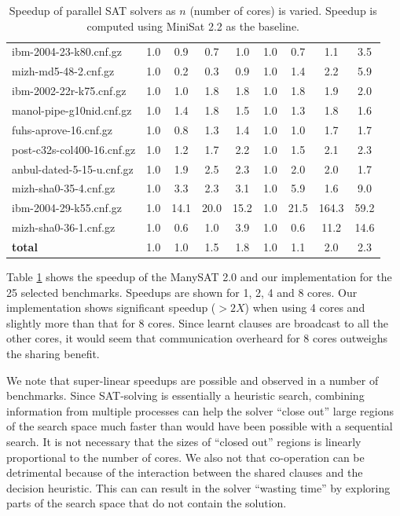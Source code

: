 \documentclass[letterpaper, compsoc, conference]{IEEEtran}
\begin{document}
\begin{table}[htbp]
\begin{center}
\begin{tabular}{|l|c|c|c|c|c|c|c|c|}
        ibm-2004-23-k80.cnf.gz             &       1.0 &  0.9 &  0.7 &  1.0 &  1.0 &  0.7 &  1.1 &  3.5 \\
        mizh-md5-48-2.cnf.gz               &       1.0 &  0.2 &  0.3 &  0.9 &  1.0 &  1.4 &  2.2 &  5.9 \\
        ibm-2002-22r-k75.cnf.gz            &       1.0 &  1.0 &  1.8 &  1.8 &  1.0 &  1.8 &  1.9 &  2.0 \\
        manol-pipe-g10nid.cnf.gz           &       1.0 &  1.4 &  1.8 &  1.5 &  1.0 &  1.3 &  1.8 &  1.6 \\
        fuhs-aprove-16.cnf.gz              &       1.0 &  0.8 &  1.3 &  1.4 &  1.0 &  1.0 &  1.7 &  1.7 \\
        post-c32s-col400-16.cnf.gz         &       1.0 &  1.2 &  1.7 &  2.2 &  1.0 &  1.5 &  2.1 &  2.3 \\
        anbul-dated-5-15-u.cnf.gz          &       1.0 &  1.9 &  2.5 &  2.3 &  1.0 &  2.0 &  2.0 &  1.7 \\
        mizh-sha0-35-4.cnf.gz              &       1.0 &  3.3 &  2.3 &  3.1 &  1.0 &  5.9 &  1.6 &  9.0 \\
        ibm-2004-29-k55.cnf.gz             &       1.0 & 14.1 & 20.0 & 15.2 &  1.0 & 21.5 &164.3 & 59.2 \\
        mizh-sha0-36-1.cnf.gz              &       1.0 &  0.6 &  1.0 &  3.9 &  1.0 &  0.6 & 11.2 & 14.6 \\
        \hline
        \textbf{total}                     &       1.0 &  1.0 &  1.5 &  1.8 &  1.0 &  1.1 &  2.0 &  2.3 \\
        \hline
    \end{tabular}
    \end{center}
    \caption{Speedup of parallel SAT solvers as $n$ (number of cores) is
    varied. Speedup is computed using MiniSat 2.2 as the baseline. }
    \label{tab:speedup}
\end{table}

Table \ref{tab:speedup} shows the speedup of the ManySAT 2.0 and our
implementation for the 25 selected benchmarks. Speedups are shown for 1, 2, 4
and 8 cores.  Our implementation shows significant speedup ($>2X$) when using 4
cores and slightly more than that for 8 cores. Since learnt clauses are
broadcast to all the other cores, it would seem that communication overheard
for 8 cores outweighs the sharing benefit. 

We note that super-linear speedups are possible and observed in a number of
benchmarks.  Since SAT-solving is essentially a heuristic search, combining
information from multiple processes can help the solver ``close out'' large
regions of the search space much faster than would have been possible with a
sequential search. It is not necessary that the sizes of ``closed out'' regions
is linearly proportional to the number of cores. We also not that co-operation
can be detrimental because of the interaction between the shared clauses and
the decision heuristic.  This can can result in the solver ``wasting time'' by
exploring parts of the search space that do not contain the solution.
\end{document}
